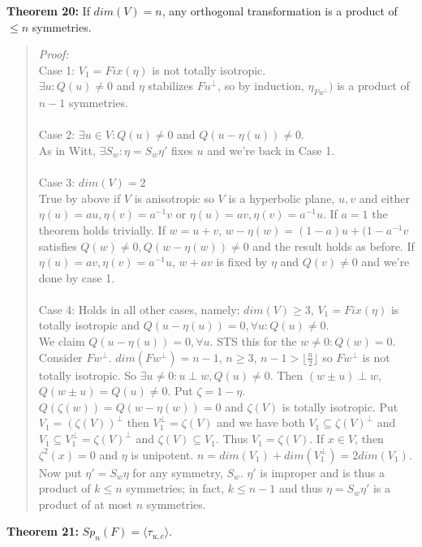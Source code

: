 {\bf Theorem 20:}
If $dim(V)=n$, any orthogonal transformation is a product of $ \le n$ symmetries.
\begin{quote}
\emph{Proof:}  
\\
Case 1: $V_1=Fix( \eta)$ is not totally isotropic.
\\
$\exists u: Q(u) \ne 0$ and $\eta$ stabilizes $F u^{\perp}$, so by induction,
$\eta_{F u^{\perp}})$ is a product of $n-1$ symmetries.
\\
\\
Case 2: $\exists u \in V: Q(u) \ne 0$ and $Q(u- \eta(u)) \ne 0$.
\\
As in Witt, $\exists S_w: \eta= S_w \eta'$ fixes $u$ and we're back in Case 1.
\\
\\
Case 3:  $dim(V)=2$
\\
True by above if $V$ is anisotropic so $V$ is a hyperbolic plane, $u,v$ and
either 
$\eta(u)= au, \eta(v)= a^{-1}v$ or
$\eta(u)= av, \eta(v)= a^{-1}u$.  If $a=1$ the theorem holds trivially.
If $w= u+v$, $w- \eta(w)= (1-a)u + (1-a^{-1}v$ satisfies $Q(w) \ne 0, Q(w- \eta(w)) \ne 0$
and the result holds as before.  If 
$\eta(u)= av, \eta(v)= a^{-1}u$, $w+av$ is fixed by $\eta$ and $Q(v) \ne 0$ and we're done by
case 1.
\\
\\
Case 4:  Holds in all other cases, namely: $dim(V) \ge 3$, $V_1=Fix( \eta )$ is
totally isotropic and $Q(u- \eta(u)) =0, \forall u: Q(u) \ne 0$.
\\
We claim $Q(u- \eta(u)) =0, \forall u$.  STS this for the $w \ne 0: Q(w)=0$.
Consider $F w^{\perp}$.  
$dim(F w^{\perp}) = n-1$, $n \ge 3$, $n-1 > \lfloor {\frac n 2} \rfloor$ so
$F w^{\perp}$ is not totally isotropic.  So $\exists u \ne 0: u \perp w, Q(u) \ne 0$.
Then $(w \pm u) \perp w$, $Q(w \pm u) = Q(u) \ne 0$.  Put $\zeta= 1- \eta$.
$Q(\zeta(w))= Q(w - \eta(w)) =0$ and $\zeta(V)$ is totally isotropic.  Put
$V_1= (\zeta(V))^{\perp}$ then $V_1^{\perp} = \zeta(V)$ and we have both
$V_1 \subseteq \zeta(V)^{\perp}$ and
$V_1 \subseteq V_1^{\perp} = \zeta(V)^{\perp}$ and $\zeta(V) \subseteq V_1$.
Thus $V_1 = \zeta(V)$.  If $x \in V$, then $\zeta^2(x) = 0$ and $\eta$ is unipotent.
$n= dim(V_1) + dim(V_1^{\perp})= 2dim(V_1)$.  Now put $\eta'= S_w \eta$ for any symmetry,
$S_w$.  $\eta'$ is improper and is thus a product of $k \le n$ symmetries; in fact,
$k \le n-1$ and thus $\eta= S_w \eta'$ is a product of at most $n$ symmetries.
\end{quote}
{\bf Theorem 21:}
$Sp_n(F)= \langle \tau_{u,c} \rangle $.
